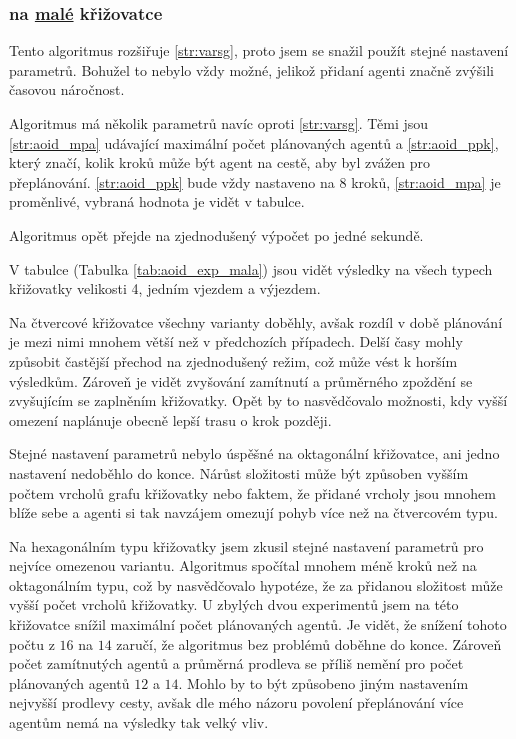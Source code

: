 \subsubsection{ na \hyperref[par:data_mala]{malé} křižovatce}
\label{subsubsec:exp_aoid_mala_krizovatka}

Tento algoritmus rozšiřuje \ref{str:varsg}, proto jsem se snažil použít stejné nastavení parametrů.
Bohužel to nebylo vždy možné, jelikož přidaní agenti značně zvýšili časovou náročnost.

Algoritmus má několik parametrů navíc oproti \ref{str:varsg}.
Těmi jsou \ref{str:aoid_mpa} udávající maximální počet plánovaných agentů
a \ref{str:aoid_ppk}, který značí, kolik kroků může být agent na cestě, aby byl zvážen pro přeplánování.
\ref{str:aoid_ppk} bude vždy nastaveno na $8$ kroků,
\ref{str:aoid_mpa} je proměnlivé, vybraná hodnota je vidět v tabulce.

Algoritmus opět přejde na zjednodušený výpočet po jedné sekundě.

V tabulce (Tabulka \ref{tab:aoid_exp_mala}) jsou vidět výsledky na všech typech křižovatky
velikosti 4, jedním vjezdem a výjezdem.

Na čtvercové křižovatce všechny varianty doběhly,
avšak rozdíl v době plánování je mezi nimi mnohem větší než v předchozích případech.
Delší časy mohly způsobit častější přechod na zjednodušený režim, což může vést k horším výsledkům.
Zároveň je vidět zvyšování zamítnutí a průměrného zpoždění se zvyšujícím se zaplněním křižovatky.
Opět by to nasvědčovalo možnosti, kdy vyšší omezení naplánuje obecně lepší trasu o krok později.

Stejné nastavení parametrů nebylo úspěšné na oktagonální křižovatce, ani jedno nastavení nedoběhlo do konce.
Nárůst složitosti může být způsoben vyšším počtem vrcholů grafu křižovatky
nebo faktem, že přidané vrcholy jsou mnohem blíže sebe
a agenti si tak navzájem omezují pohyb více než na čtvercovém typu.

Na hexagonálním typu křižovatky jsem zkusil stejné nastavení parametrů pro nejvíce omezenou variantu.
Algoritmus spočítal mnohem méně kroků než na oktagonálním typu, což by nasvědčovalo hypotéze,
že za přidanou složitost může vyšší počet vrcholů křižovatky.
U zbylých dvou experimentů jsem na této křižovatce snížil maximální počet plánovaných agentů.
Je vidět, že snížení tohoto počtu z $16$ na $14$ zaručí, že algoritmus bez problémů doběhne do konce.
Zároveň počet zamítnutých agentů a průměrná prodleva se příliš nemění pro počet plánovaných agentů $12$ a $14$.
Mohlo by to být způsobeno jiným nastavením nejvyšší prodlevy cesty,
avšak dle mého názoru povolení přeplánování více agentům nemá na výsledky tak velký vliv.

